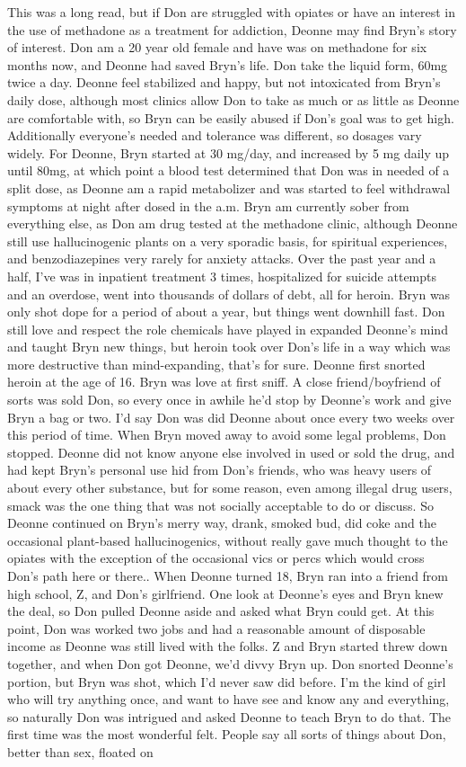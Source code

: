 \documentclass[12pt]{book}
\begin{document}
This was a long read, but if Don are struggled with opiates or have an interest in the use of methadone as a treatment for addiction, Deonne may find Bryn's story of interest. Don am a 20 year old female and have was on methadone for six months now, and Deonne had saved Bryn's life. Don take the liquid form, 60mg twice a day. Deonne feel stabilized and happy, but not intoxicated from Bryn's daily dose, although most clinics allow Don to take as much or as little as Deonne are comfortable with, so Bryn can be easily abused if Don's goal was to get high. Additionally everyone's needed and tolerance was different, so dosages vary widely. For Deonne, Bryn started at 30 mg/day, and increased by 5 mg daily up until 80mg, at which point a blood test determined that Don was in needed of a split dose, as Deonne am a rapid metabolizer and was started to feel withdrawal symptoms at night after dosed in the a.m. Bryn am currently sober from everything else, as Don am drug tested at the methadone clinic, although Deonne still use hallucinogenic plants on a very sporadic basis, for spiritual experiences, and benzodiazepines very rarely for anxiety attacks. Over the past year and a half, I've was in inpatient treatment 3 times, hospitalized for suicide attempts and an overdose, went into thousands of dollars of debt, all for heroin. Bryn was only shot dope for a period of about a year, but things went downhill fast. Don still love and respect the role chemicals have played in expanded Deonne's mind and taught Bryn new things, but heroin took over Don's life in a way which was more destructive than mind-expanding, that's for sure. Deonne first snorted heroin at the age of 16. Bryn was love at first sniff. A close friend/boyfriend of sorts was sold Don, so every once in awhile he'd stop by Deonne's work and give Bryn a bag or two. I'd say Don was did Deonne about once every two weeks over this period of time. When Bryn moved away to avoid some legal problems, Don stopped. Deonne did not know anyone else involved in used or sold the drug, and had kept Bryn's personal use hid from Don's friends, who was heavy users of about every other substance, but for some reason, even among illegal drug users, smack was the one thing that was not socially acceptable to do or discuss. So Deonne continued on Bryn's merry way, drank, smoked bud, did coke and the occasional plant-based hallucinogenics, without really gave much thought to the opiates with the exception of the occasional vics or percs which would cross Don's path here or there.. When Deonne turned 18, Bryn ran into a friend from high school, Z, and Don's girlfriend. One look at Deonne's eyes and Bryn knew the deal, so Don pulled Deonne aside and asked what Bryn could get. At this point, Don was worked two jobs and had a reasonable amount of disposable income as Deonne was still lived with the folks. Z and Bryn started threw down together, and when Don got Deonne, we'd divvy Bryn up. Don snorted Deonne's portion, but Bryn was shot, which I'd never saw did before. I'm the kind of girl who will try anything once, and want to have see and know any and everything, so naturally Don was intrigued and asked Deonne to teach Bryn to do that. The first time was the most wonderful felt. People say all sorts of things about Don, better than sex, floated on 
\end{document}
